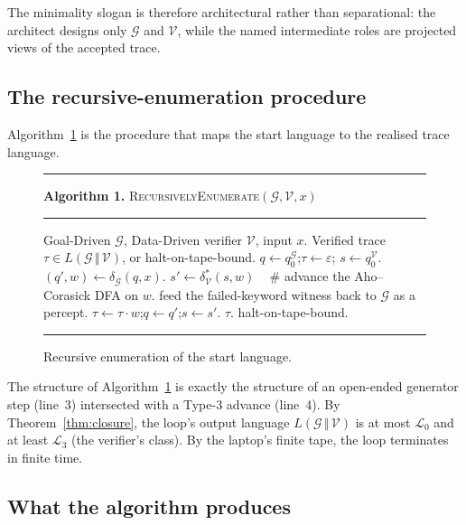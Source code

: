 The minimality slogan is therefore architectural rather than
separational: the architect designs only $\mathcal{G}$ and
$\mathcal{V}$, while the named intermediate roles are projected
views of the accepted trace.

\subsection{The recursive-enumeration procedure}

Algorithm~\ref{alg:enum} is the procedure that maps the start
language to the realised trace language.

\begin{figure}[ht]
\noindent\rule{\columnwidth}{0.4pt}
\textbf{Algorithm 1.} \textsc{RecursivelyEnumerate}$(\mathcal{G},
\mathcal{V}, x)$
\par\noindent\rule{\columnwidth}{0.4pt}
\begin{algorithmic}[1]
\REQUIRE Goal-Driven $\mathcal{G}$, Data-Driven verifier
$\mathcal{V}$, input $x$.
\ENSURE Verified trace $\tau\in L(\mathcal{G}\,\Vert\,\mathcal{V})$,
or \textsf{halt-on-tape-bound}.
\STATE $q\gets q_0^\mathcal{G}$;\quad $\tau\gets\varepsilon$;\quad
$s\gets q_0^\mathcal{V}$.
\LOOP
  \STATE $(q', w) \gets \delta_\mathcal{G}(q, x)$.
  \STATE $s' \gets \delta_\mathcal{V}^*(s, w)$ \,\,\,\,\,\#
       advance the Aho--Corasick DFA on $w$.
    \STATE feed the failed-keyword witness back to $\mathcal{G}$
    as a percept.
  \ELSE
    \STATE $\tau \gets \tau\cdot w$;\quad $q\gets q'$;\quad $s\gets s'$.
      \RETURN $\tau$.
    \ENDIF
  \ENDIF
    \RETURN \textsf{halt-on-tape-bound}.
  \ENDIF
\ENDLOOP
\end{algorithmic}
\rule{\columnwidth}{0.4pt}
\caption{Recursive enumeration of the start language.}
\label{alg:enum}
\end{figure}

The structure of Algorithm~\ref{alg:enum} is exactly the structure
of an open-ended generator step (line~3) intersected with a Type-3 advance
(line~4).  By Theorem~\ref{thm:closure}, the loop's output
language $L(\mathcal{G}\,\Vert\,\mathcal{V})$ is at most
$\mathcal{L}_0$ and at least $\mathcal{L}_3$ (the verifier's
class).  By the laptop's finite tape, the loop terminates in
finite time.

\subsection{What the algorithm produces}

